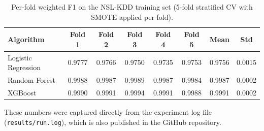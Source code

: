 \documentclass[11pt, a4paper]{article}
\begin{document}
\begin{table}[H]
\centering
\caption{Per-fold weighted F1 on the NSL-KDD training set (5-fold stratified CV with SMOTE applied per fold).}
\label{tab:cvfolds}
\begin{tabular}{lccccc|cc}
\toprule
Algorithm & Fold 1 & Fold 2 & Fold 3 & Fold 4 & Fold 5 & Mean & Std \\
\midrule
Logistic Regression & 0.9777 & 0.9766 & 0.9750 & 0.9735 & 0.9753 & 0.9756 & 0.0015 \\
Random Forest       & 0.9988 & 0.9987 & 0.9989 & 0.9987 & 0.9984 & 0.9987 & 0.0002 \\
XGBoost             & 0.9990 & 0.9991 & 0.9994 & 0.9991 & 0.9988 & 0.9991 & 0.0002 \\
\bottomrule
\end{tabular}
\end{table}

These numbers were captured directly from the experiment log file (\texttt{results/run.log}), which is also published in the GitHub repository.
\end{document}
